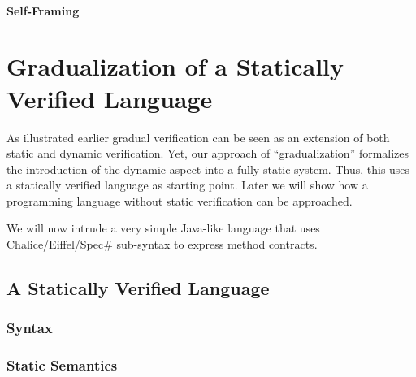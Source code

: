 \subsubsection{Self-Framing}





\chapter{Gradualization of a Statically Verified Language}
As illustrated earlier %
gradual verification can be seen as an extension of both static and dynamic verification.
Yet, our approach of “gradualization” formalizes the introduction of the dynamic aspect into a fully static system.
Thus, this %
uses a statically verified language as starting point.
Later %
we will show how a programming language without static verification can be approached.

We will now intrude a very simple Java-like language that uses Chalice/Eiffel/Spec\# %
 sub-syntax to express method contracts.


\section{A Statically Verified Language}
\label{sec:a-statically-verified}


\subsection{Syntax}
\label{sec:syntax}


\subsection{Static Semantics}
\label{sec:static-semantics}


